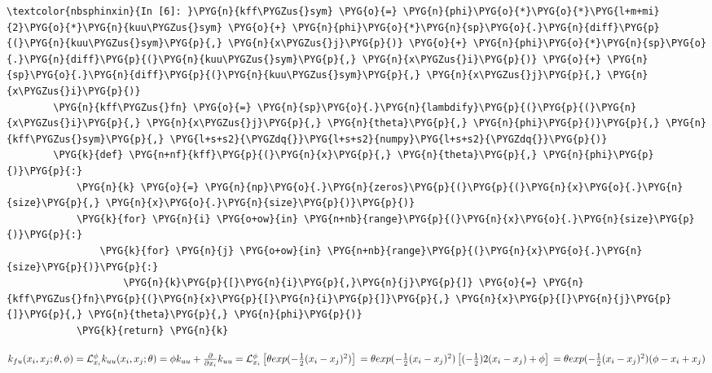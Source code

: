 \documentclass[letterpaper,10pt,english]{sphinxmanual}
\begin{document}
%
\begin{Verbatim}[commandchars=\\\{\}]
\textcolor{nbsphinxin}{In [6]: }\PYG{n}{kff\PYGZus{}sym} \PYG{o}{=} \PYG{n}{phi}\PYG{o}{*}\PYG{o}{*}\PYG{l+m+mi}{2}\PYG{o}{*}\PYG{n}{kuu\PYGZus{}sym} \PYG{o}{+} \PYG{n}{phi}\PYG{o}{*}\PYG{n}{sp}\PYG{o}{.}\PYG{n}{diff}\PYG{p}{(}\PYG{n}{kuu\PYGZus{}sym}\PYG{p}{,} \PYG{n}{x\PYGZus{}j}\PYG{p}{)} \PYG{o}{+} \PYG{n}{phi}\PYG{o}{*}\PYG{n}{sp}\PYG{o}{.}\PYG{n}{diff}\PYG{p}{(}\PYG{n}{kuu\PYGZus{}sym}\PYG{p}{,} \PYG{n}{x\PYGZus{}i}\PYG{p}{)} \PYG{o}{+} \PYG{n}{sp}\PYG{o}{.}\PYG{n}{diff}\PYG{p}{(}\PYG{n}{kuu\PYGZus{}sym}\PYG{p}{,} \PYG{n}{x\PYGZus{}j}\PYG{p}{,} \PYG{n}{x\PYGZus{}i}\PYG{p}{)}
        \PYG{n}{kff\PYGZus{}fn} \PYG{o}{=} \PYG{n}{sp}\PYG{o}{.}\PYG{n}{lambdify}\PYG{p}{(}\PYG{p}{(}\PYG{n}{x\PYGZus{}i}\PYG{p}{,} \PYG{n}{x\PYGZus{}j}\PYG{p}{,} \PYG{n}{theta}\PYG{p}{,} \PYG{n}{phi}\PYG{p}{)}\PYG{p}{,} \PYG{n}{kff\PYGZus{}sym}\PYG{p}{,} \PYG{l+s+s2}{\PYGZdq{}}\PYG{l+s+s2}{numpy}\PYG{l+s+s2}{\PYGZdq{}}\PYG{p}{)}
        \PYG{k}{def} \PYG{n+nf}{kff}\PYG{p}{(}\PYG{n}{x}\PYG{p}{,} \PYG{n}{theta}\PYG{p}{,} \PYG{n}{phi}\PYG{p}{)}\PYG{p}{:}
            \PYG{n}{k} \PYG{o}{=} \PYG{n}{np}\PYG{o}{.}\PYG{n}{zeros}\PYG{p}{(}\PYG{p}{(}\PYG{n}{x}\PYG{o}{.}\PYG{n}{size}\PYG{p}{,} \PYG{n}{x}\PYG{o}{.}\PYG{n}{size}\PYG{p}{)}\PYG{p}{)}
            \PYG{k}{for} \PYG{n}{i} \PYG{o+ow}{in} \PYG{n+nb}{range}\PYG{p}{(}\PYG{n}{x}\PYG{o}{.}\PYG{n}{size}\PYG{p}{)}\PYG{p}{:}
                \PYG{k}{for} \PYG{n}{j} \PYG{o+ow}{in} \PYG{n+nb}{range}\PYG{p}{(}\PYG{n}{x}\PYG{o}{.}\PYG{n}{size}\PYG{p}{)}\PYG{p}{:}
                    \PYG{n}{k}\PYG{p}{[}\PYG{n}{i}\PYG{p}{,}\PYG{n}{j}\PYG{p}{]} \PYG{o}{=} \PYG{n}{kff\PYGZus{}fn}\PYG{p}{(}\PYG{n}{x}\PYG{p}{[}\PYG{n}{i}\PYG{p}{]}\PYG{p}{,} \PYG{n}{x}\PYG{p}{[}\PYG{n}{j}\PYG{p}{]}\PYG{p}{,} \PYG{n}{theta}\PYG{p}{,} \PYG{n}{phi}\PYG{p}{)}
            \PYG{k}{return} \PYG{n}{k}
\end{Verbatim}

\(k_{fu}(x_i,x_j;\theta,\phi) \\ = \mathcal{L}_{x_i}^\phi k_{uu}(x_i, x_j; \theta) \\ = \phi k_{uu} + \frac{\partial}{\partial x_i}k_{uu} \\ = \mathcal{L}_{x_i}^\phi \left[ \theta exp(-\frac{1}{2}(x_i-x_j)^2) \right] \\ = \theta exp(-\frac{1}{2}(x_i-x_j)^2) \left[ (-\frac{1}{2})2(x_i-x_j) + \phi \right] \\ = \theta exp(-\frac{1}{2}(x_i-x_j)^2)(\phi-x_i+x_j)\)
\end{document}
